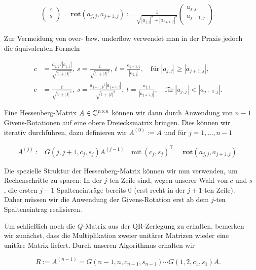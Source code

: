 \documentclass{article}
\begin{document}
\begin{theorem}
\begin{align*}
\left(\begin{array}{c}
    c \\
    s \\
\end{array}\right)
=
\textbf{rot}(a_{j,j},a_{j+1,j})
:=
\frac{1}{\sqrt{|a_{j,j}|^2 + |a_{j+1,j}|^2}}
\left(\begin{array}{c}
a_{j,j} \\
a_{j+1,j} \\
\end{array}\right).
\end{align*}

Zur Vermeidung von over- bzw. underflow verwendet man in der Praxis jedoch die äquivalenten Formeln

\begin{align*}
	c &= \frac{a_{j,j} / |a_{j,j}|}{\sqrt{1+|t|^2}},~
	s = \frac{t}{\sqrt{1 +|t|^2}},~
	t = \frac{a_{j+1,j}}{|a_{j,j}|}, \quad
	\text{für}~ |a_{j,j}| \geq |a_{j+1,j}|, \\
	c &= \frac{t}{\sqrt{1 +|t|^2}},~
	s = \frac{a_{j+1,j} / |a_{j+1,j}|}{\sqrt{1+|t|^2}},~
	t = \frac{a_{j,j}}{|a_{j+1,j}|}, \quad
	\text{für}~ |a_{j,j}| < |a_{j+1,j}|.
\end{align*}

Eine Hessenberg-Matrix $A \in \mathbb{C}^{n\times n}$ können wir dann durch Anwendung von $n-1$ Givens-Rotationen auf eine obere Dreiecksmatrix bringen. Dies können wir iterativ durchführen, dazu definieren wir $A^{(0)} := A$ und für $j = 1,\dots, n-1$

\begin{align*}
	A^{(j)} :=
	G(j, j+1, c_j, s_j)A^{(j-1)} \quad
	\text{mit}~
	(c_j, s_j)^\top  = \textbf{rot}(a_{j,j},a_{j+1,j}).
\end{align*}

Die spezielle Struktur der Hessenberg-Matrix können wir nun verwenden, um Rechenschritte zu sparen: In der $j$-ten Zeile sind, wegen unserer Wahl von $c$ und $s$, die ersten $j-1$ Spalteneinträge bereits $0$ (erst recht in der $j+1$-ten Zeile). Daher müssen wir die Anwendung der Givens-Rotation erst ab dem $j$-ten Spalteneintrag realisieren.

Um schließlich noch die $Q$-Matrix aus der QR-Zerlegung zu erhalten, bemerken wir zunächst, dass die Multiplikation zweier unitärer Matrizen wieder eine unitäre Matrix liefert. Durch unseren Algorithmus erhalten wir

$$
R := A^{(n-1)} = G(n-1,n,c_{n-1},s_{n-1})\cdots G(1,2, c_1, s_1) A.
$$


\end{theorem}
\end{document}
